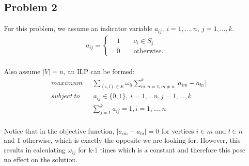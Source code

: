 \subsection*{Problem 2}
\paragraph{}
For this problem, we assume an indicator variable $a_{ij},\ i=1,...,n,\ j=1,...,k$.
\begin{align*}
a_{ij} = \begin{cases}
&1 \qquad v_i \in S_j\\
&0 \qquad \text{otherwise}.
\end{cases}
\end{align*}
\paragraph{}
Also assume $|V|=n$, an ILP can be formed:
\begin{align*}
& maximum \quad \ \ \sum_{(i,l)\in E}\omega_{il}\sum_{m,n=1,m \neq n}^{k}|a_{im} -a_{ln}| \\
& subject \ to \qquad a_{ij} \in\{0,1\},\ i=1,...n, j=1,...,k\\
&\qquad \qquad \quad \quad \sum_{j=1}^{k}a_{ij}=1, i=1,...,n
\end{align*}
\paragraph{}
Notice that in the objective function, $|a_{im} -a_{ln}|=0$ for vertices $i \in m$ and $l \in n$ and 1 otherwise, which is exactly the opposite we are looking for. However, this results in calculating $\omega_{ij}$ for k-1 times which is a constant and therefore this pose no effect on the solution.